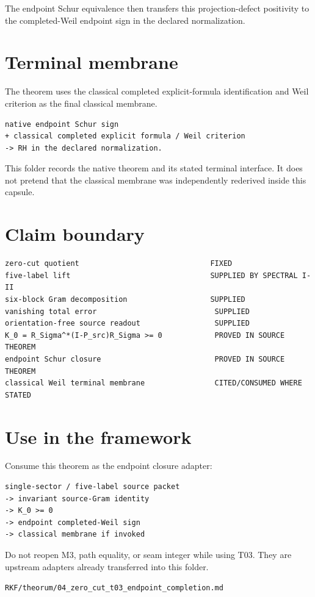 The endpoint Schur equivalence then transfers this projection-defect positivity to the completed-Weil endpoint sign in the declared normalization.

\hypertarget{terminal-membrane}{%
\section{Terminal membrane}\label{terminal-membrane}}

The theorem uses the classical completed explicit-formula identification and Weil criterion as the final classical membrane.

\begin{verbatim}
native endpoint Schur sign
+ classical completed explicit formula / Weil criterion
-> RH in the declared normalization.
\end{verbatim}

This folder records the native theorem and its stated terminal interface. It does not pretend that the classical membrane was independently rederived inside this capsule.

\hypertarget{claim-boundary}{%
\section{Claim boundary}\label{claim-boundary}}

\begin{verbatim}
zero-cut quotient                              FIXED
five-label lift                                SUPPLIED BY SPECTRAL I-II
six-block Gram decomposition                   SUPPLIED
vanishing total error                           SUPPLIED
orientation-free source readout                 SUPPLIED
K_0 = R_Sigma^*(I-P_src)R_Sigma >= 0            PROVED IN SOURCE THEOREM
endpoint Schur closure                          PROVED IN SOURCE THEOREM
classical Weil terminal membrane                CITED/CONSUMED WHERE STATED
\end{verbatim}

\hypertarget{use-in-the-framework}{%
\section{Use in the framework}\label{use-in-the-framework}}

Consume this theorem as the endpoint closure adapter:

\begin{verbatim}
single-sector / five-label source packet
-> invariant source-Gram identity
-> K_0 >= 0
-> endpoint completed-Weil sign
-> classical membrane if invoked
\end{verbatim}

Do not reopen M3, path equality, or seam integer while using T03. They are upstream adapters already transferred into this folder.

\begin{flushright}\small\texttt{RKF/theorum/04\_zero\_cut\_t03\_endpoint\_completion.md}\end{flushright}
